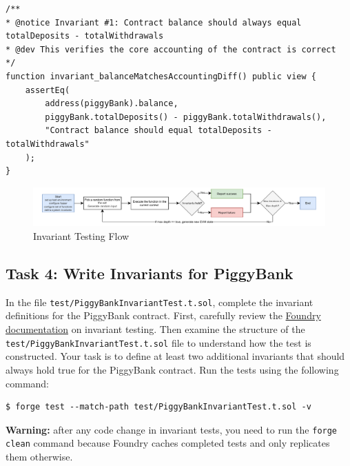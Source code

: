 \documentclass[12pt]{article}
\begin{document}
\noindent \begin{minipage}{\textwidth}
    \begin{lstlisting}[language=Solidity]
/**
* @notice Invariant #1: Contract balance should always equal totalDeposits - totalWithdrawals
* @dev This verifies the core accounting of the contract is correct
*/
function invariant_balanceMatchesAccountingDiff() public view {
    assertEq(
        address(piggyBank).balance,
        piggyBank.totalDeposits() - piggyBank.totalWithdrawals(),
        "Contract balance should equal totalDeposits - totalWithdrawals"
    );
}
\end{lstlisting}
\end{minipage}

\begin{figure}[h!]
    \centering
    \includegraphics[width=1\textwidth]{invariant-testing.pdf}
    \caption{Invariant Testing Flow}\label{fig:invariant-testing}
\end{figure}

\subsection*{Task 4: Write Invariants for PiggyBank}

In the file \texttt{test/PiggyBankInvariantTest.t.sol}, complete the invariant
definitions for the PiggyBank contract. First, carefully review the
\href{https://book.getfoundry.sh/forge/invariant-testing}{Foundry
    documentation} on invariant testing. Then examine the structure of the
\texttt{test/PiggyBankInvariantTest.t.sol} file to understand how the test is
constructed. Your task is to define at least two additional invariants that
should always hold true for the PiggyBank contract. Run the tests using the
following command:

\noindent \begin{minipage}{\textwidth}
    \begin{verbatim}
$ forge test --match-path test/PiggyBankInvariantTest.t.sol -v
\end{verbatim}
\end{minipage}

\noindent
\textbf{Warning:} after any code change in invariant tests, you need to run the \texttt{forge clean} command because Foundry caches completed tests and only replicates them otherwise.
\end{document}
